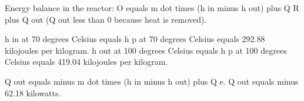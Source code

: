 Energy balance in the reactor:  
O equals m dot times (h in minus h out) plus Q R plus Q out (Q out less than 0 because heat is removed).  

h in at 70 degrees Celsius equals h p at 70 degrees Celsius equals 292.88 kilojoules per kilogram.  
h out at 100 degrees Celsius equals h p at 100 degrees Celsius equals 419.04 kilojoules per kilogram.  

Q out equals minus m dot times (h in minus h out) plus Q e.  
Q out equals minus 62.18 kilowatts.